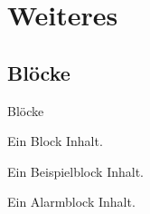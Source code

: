 \documentclass[student]{ihfBeamer} %
\begin{document}
\section{Weiteres}
\contentframe
\subsection{Blöcke}

\begin{frame}{Blöcke}
\begin{block}{Ein Block}
\alert<2>{Inhalt.}
\end{block}

\begin{exampleblock}{Ein Beispielblock}
Inhalt.
\end{exampleblock}

\begin{alertblock}{Ein Alarmblock}
Inhalt.
\end{alertblock}

\end{frame}
\end{document}
